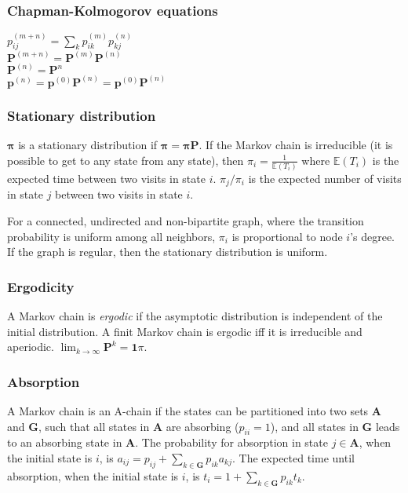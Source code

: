 \subsubsection{Chapman-Kolmogorov equations}
$p_{ij}^{(m+n)}=\sum_k p_{ik}^{(m)}p_{kj}^{(n)}$\\
$\mathbf{P}^{(m+n)} = \mathbf{P}^{(m)}\mathbf{P}^{(n)}$\\
$\mathbf{P}^{(n)} = \mathbf{P}^n$\\
$\mathbf{p}^{(n)} = \mathbf{p}^{(0)}\mathbf{P}^{(n)} = \mathbf{p}^{(0)}\mathbf{P}^{(n)}$

\subsubsection{Stationary distribution}
$\mathbf{\pi}$ is a stationary distribution if $\mathbf{\pi} = \mathbf{\pi P}$. If the Markov chain is irreducible (it is possible to get to any state from any state), then $\pi_i = \frac{1}{\mathbb{E}(T_i)}$ where $\mathbb{E}(T_i)$  is the expected time between two visits in state $i$. $\pi_j/\pi_i$ is the expected number of visits in state $j$ between two visits in state $i$.

For a connected, undirected and non-bipartite graph, where the transition probability is uniform among all neighbors, $\pi_i$ is proportional to node $i$'s degree. If the graph is regular, then the stationary distribution is uniform.

\subsubsection{Ergodicity}
A Markov chain is \emph{ergodic} if the asymptotic distribution is independent of the initial distribution. A finit Markov chain is ergodic iff it is irreducible and aperiodic. $\lim_{k\rightarrow\infty}\mathbf{P}^k = \mathbf{1}\pi$.

\subsubsection{Absorption}
A Markov chain is an A-chain if the states can be partitioned into two sets $\mathbf{A}$ and $\mathbf{G}$, such that all states in $\mathbf{A}$ are absorbing ($p_{ii}=1$), and all states in $\mathbf{G}$ leads to an absorbing state in $\mathbf{A}$. The probability for absorption in state $j\in\mathbf{A}$, when the initial state is $i$, is $a_{ij} = p_{ij}+\sum_{k\in\mathbf{G}} p_{ik}a_{kj}$. The expected time until absorption, when the initial state is $i$, is $t_i = 1+\sum_{k\in\mathbf{G}}p_{ik}t_k$.
